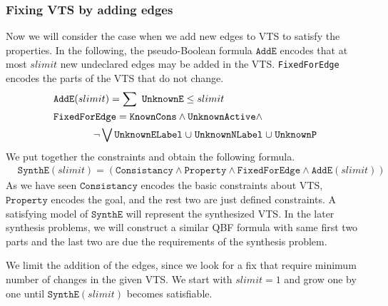 \subsubsection{Fixing VTS by adding edges}
%
Now we will consider the case when we add new edges to VTS to satisfy the properties.
%
In the following, the pseudo-Boolean formula $\texttt{AddE}$ encodes
that at most $slimit$ new undeclared edges may be added in the VTS.
%
\texttt{FixedForEdge} encodes the parts of the VTS that do not change.
\begin{align*}
  &\texttt{AddE}(slimit) = \sum~\texttt{UnknownE} \leq slimit\\
  &\texttt{FixedForEdge} = \texttt{KnownCons} \land \texttt{UnknownActive} \land\\
   & \quad\quad\quad\quad \lnot \bigvee \texttt{UnknownELabel} \;{\cup}\;
                    \texttt{UnknownNLabel} \;{\cup}\;
                    \texttt{UnknownP}
\end{align*}
We put together the constraints and obtain the following formula.
\begin{align*}
  & \texttt{SynthE}(slimit) =
     (  \texttt{Consistancy}\land \texttt{Property} \land
   \texttt{FixedForEdge} \land
  \texttt{AddE}(slimit) )
\end{align*}
As we have seen $\texttt{Consistancy}$ encodes the basic constraints about VTS,
$\texttt{Property}$ encodes the goal, and
the rest two are just defined constraints.
%
A satisfying model of $\texttt{SynthE}$ will represent the synthesized VTS.
%
In the later synthesis problems, we will construct a similar QBF
formula with same first two parts and the last two are due the
requirements of the synthesis problem.

We limit the addition of the edges, since we look for a fix that require minimum number
of changes in the given VTS.
%
We start with $slimit = 1$ and grow one by one until $\texttt{SynthE}(slimit)$
becomes satisfiable.

